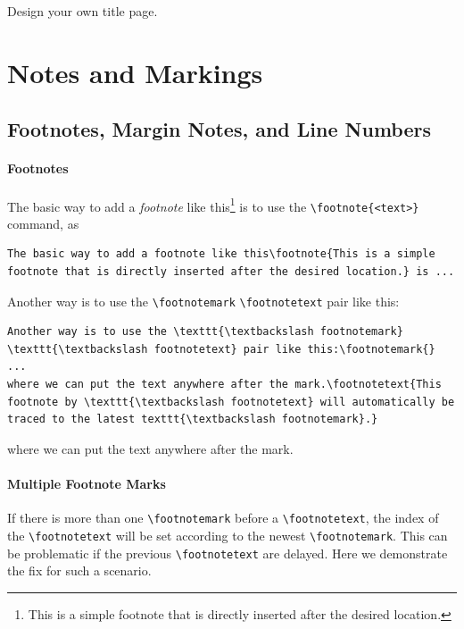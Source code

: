\begin{exercisebox}
\begin{Exercise}
Design your own title page.
\end{Exercise}
\end{exercisebox}

\section{Notes and Markings}

\subsection{Footnotes, Margin Notes, and Line Numbers}

\paragraph{Footnotes}
The basic way to add a \textit{footnote} like this\footnote{This is a simple footnote that is directly inserted after the desired location.} is to use the \texttt{\textbackslash footnote\allowbreak\{<text>\}} command, as
\begin{lstlisting}
The basic way to add a footnote like this\footnote{This is a simple footnote that is directly inserted after the desired location.} is ...   
\end{lstlisting}
Another way is to use the \texttt{\textbackslash footnotemark} \texttt{\textbackslash footnotetext} pair like this:\footnotemark{}
\begin{lstlisting}
Another way is to use the \texttt{\textbackslash footnotemark} \texttt{\textbackslash footnotetext} pair like this:\footnotemark{}
...
where we can put the text anywhere after the mark.\footnotetext{This footnote by \texttt{\textbackslash footnotetext} will automatically be traced to the latest texttt{\textbackslash footnotemark}.}
\end{lstlisting}
where we can put the text anywhere after the mark.

\paragraph{Multiple Footnote Marks}
If there is more than one \texttt{\textbackslash footnotemark} before a \texttt{\textbackslash footnotetext}, the index of the \texttt{\textbackslash footnotetext} will be set according to the newest \texttt{\textbackslash footnotemark}. This can be problematic if the previous \texttt{\textbackslash footnotetext} are delayed. Here we demonstrate the fix\footnotemark{} for such a scenario\footnotemark{}.

